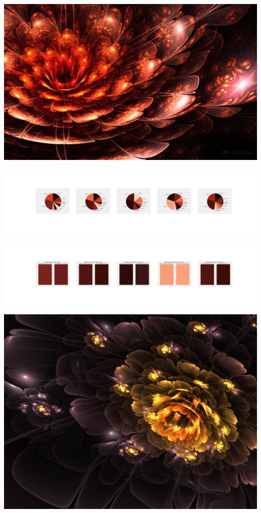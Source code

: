 \documentclass[11pt]{article}
\begin{document}
\begin{landscape}
    \begin{center}
    \includegraphics[width=\textwidth]{./nbimg/file (50).jpg}
    \end{center}

    \begin{center}
    \includegraphics[width=250mm]{./nbimg/pie-397.jpg}
    \end{center}

    \begin{center}
    \includegraphics[width=250mm]{./nbimg/peak-397.jpg}
    \end{center}
    

    \begin{center}
    \includegraphics[width=\textwidth]{./nbimg/file (51).jpg}
    \end{center}


\end{landscape}
\end{document}
